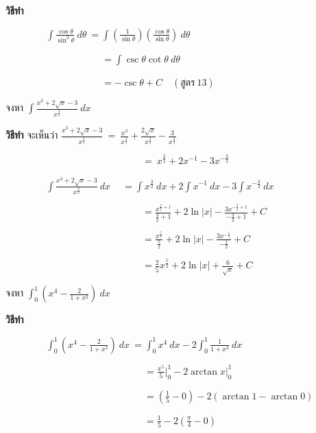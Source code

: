 \documentclass[
]{book}
\begin{document}
\textbf{วิธีทำ}

\(\qquad \qquad \ \displaystyle \int \frac{\cos \theta}{\sin^{2} \theta} \ 
d\theta \ = \int \left(\frac{1}{\sin \theta}\right) \left(\frac{\cos
\theta}{\sin \theta}\right) \ d\theta\)

\(\qquad \qquad \qquad \qquad \qquad = \displaystyle \int \csc \theta \cot
\theta \ d\theta\)

\(\qquad \qquad \qquad \qquad \qquad = \displaystyle -\csc \theta +C \quad (
\mbox{สูตร} \ 13)\)

จงหา \(\displaystyle \int
\frac{x^{3}+2\sqrt{x}-3}{x^{\frac{3}{2}}} \ dx\)

\textbf{วิธีทำ} จะเห็นว่า \(\displaystyle
\frac{x^{3}+2\sqrt{x}-3}{x^{\frac{3}{2}}} \ = \ 
\frac{x^{3}}{x^{\frac{3}{2}}}+\frac{2\sqrt{x}}{x^{\frac{3}{2}}}-\frac{3}{x^{\frac{3}{2}}}\)

\(\qquad \qquad \qquad \qquad \qquad \qquad \qquad \ = \ 
x^{\frac{3}{2}}+2x^{-1}-3x^{-\frac{3}{2}}\)

\(\qquad \qquad\ \displaystyle \int \frac{x^{3}+2\sqrt{x}-3}{x^{\frac{3}{2}}}
\ dx \quad \ = \int x^{\frac{3}{2}} \ dx +2 \int x^{-1} \ dx -3 \int
x^{-\frac{3}{2}} \ dx\)

\(\qquad \qquad \qquad \qquad \qquad \qquad \qquad \ =\displaystyle
\frac{x^{\frac{3}{2}+1}}{\frac{3}{2}+1}  + 2 \ln |x|
-\frac{3x^{-\frac{3}{2}+1}}{-\frac{3}{2}+1} + C\)

\(\qquad \qquad \qquad \qquad \qquad \qquad \qquad \ =\displaystyle
\frac{x^{\frac{5}{2}}}{\frac{5}{2}} + 2 \ln
|x|-\frac{3x^{-\frac{1}{2}}}{-\frac{1}{2}}+ C\)

\(\qquad \qquad \qquad \qquad \qquad \qquad \qquad \ =\displaystyle
\frac{2}{5}x^{\frac{5}{2}}+ 2 \ln |x|+\frac{6}{\sqrt{x}}+ C\)

จงหา \(\displaystyle \int_{0}^{1} \left( x^{4} -
\frac{2}{1+x^{2}} \right) \ dx\)

\textbf{วิธีทำ}

\(\qquad \qquad\ \displaystyle \int_{0}^{1} \left( x^{4} - \frac{2}{1+x^{2}}
\right) \ dx \ = \int_{0}^{1} x^{4} \ dx - 2 \int_{0}^{1} \frac{1}{1+x^{2}}
\ dx\)

\(\qquad \qquad \qquad \qquad \qquad \qquad \qquad \ \ =\displaystyle
\frac{x^{5}}{5} \bigg |_{0}^{1}-2 \arctan x \bigg |_{0}^{1}\)

\(\qquad \qquad \qquad \qquad \qquad \qquad \qquad \ \ = \displaystyle \left(
\frac{1}{5} - 0 \right) - 2 \left( \arctan 1 - \arctan 0 \right)\)

\(\qquad \qquad \qquad \qquad \qquad \qquad \qquad \ \ =\displaystyle
\frac{1}{5}-2 \left( \frac{ \pi }{4}-0 \right)\)
\end{document}
